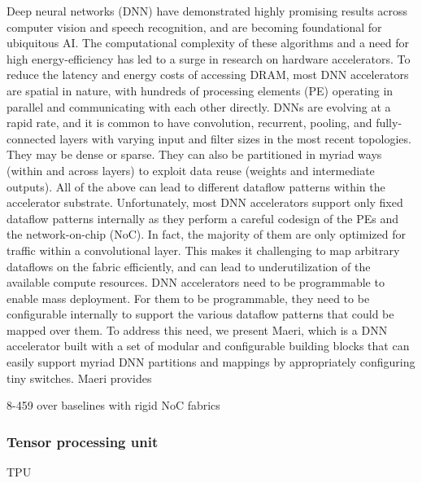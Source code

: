 Deep neural networks (DNN) have demonstrated highly
promising results across computer vision and speech recognition, and are becoming foundational for ubiquitous AI. The
computational complexity of these algorithms and a need for
high energy-efficiency has led to a surge in research on hardware accelerators. To reduce the latency and energy costs
of accessing DRAM, most DNN accelerators are spatial in
nature, with hundreds of processing elements (PE) operating
in parallel and communicating with each other directly.
DNNs are evolving at a rapid rate, and it is common to
have convolution, recurrent, pooling, and fully-connected
layers with varying input and filter sizes in the most recent
topologies. They may be dense or sparse. They can also be
partitioned in myriad ways (within and across layers) to
exploit data reuse (weights and intermediate outputs). All of
the above can lead to different dataflow patterns within the
accelerator substrate.
Unfortunately, most DNN accelerators support only fixed
dataflow patterns internally as they perform a careful codesign of the PEs and the network-on-chip (NoC). In fact,
the majority of them are only optimized for traffic within
a convolutional layer. This makes it challenging to map arbitrary dataflows on the fabric efficiently, and can lead to
underutilization of the available compute resources.
DNN accelerators need to be programmable to enable
mass deployment. For them to be programmable, they need
to be configurable internally to support the various dataflow
patterns that could be mapped over them. To address this
need, we present Maeri, which is a DNN accelerator built
with a set of modular and configurable building blocks that
can easily support myriad DNN partitions and mappings
by appropriately configuring tiny switches. Maeri provides

8-459%
over baselines with rigid NoC fabrics


\subsubsection{Tensor processing unit}

TPU 

